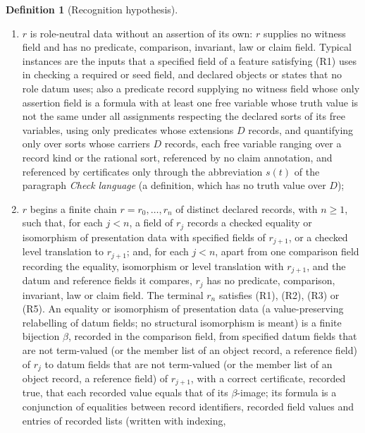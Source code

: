 \documentclass[11pt]{article}
\theoremstyle{definition}
\newtheorem{definition}[theorem]{Definition}
\begin{document}
\begin{definition}[Recognition hypothesis]
\begin{enumerate}[label=(R\arabic*),topsep=2pt,itemsep=1pt]
    formula schema of a witness-schema annotation has field role datum or
    reference; a substantive assertion in a claim statement is represented by
    content records (Definition~\ref{def:annotations}), which are assessed
    under (R1)--(R5);
  \item \(r\) is role-neutral data without an assertion of its own: \(r\)
    supplies no witness field and has no predicate, comparison, invariant,
    law or claim field. Typical instances are the inputs that a specified field
    of a feature satisfying (R1) uses in checking a required or seed field, and
    declared objects or states that no role datum uses; also a predicate record supplying no witness field whose only assertion field is a formula with at least one free variable whose truth value is not the same under all assignments respecting the declared sorts of its free variables, using only predicates whose extensions \(D\) records, and quantifying only over sorts whose carriers \(D\) records, each free variable ranging over a record kind or the rational sort, referenced by no claim annotation, and referenced by certificates only through the abbreviation \(s(t)\) of the paragraph \emph{Check language} (a definition, which has no truth value over \(D\));
  \item \(r\) begins a finite chain \(r=r_0,\ldots,r_n\) of distinct
    declared records, with \(n\geq1\), such that, for each \(j<n\), a field of \(r_j\) records a checked
    equality or isomorphism of presentation data with specified fields of
    \(r_{j+1}\), or a checked level translation to \(r_{j+1}\); and, for each \(j<n\), apart from one comparison field recording the equality, isomorphism or level translation with \(r_{j+1}\), and the datum and reference fields it compares, \(r_j\) has no predicate, comparison, invariant, law or claim field. The terminal \(r_n\) satisfies (R1), (R2), (R3) or
    (R5). An equality or isomorphism of presentation data (a value-preserving
    relabelling of datum fields; no structural isomorphism is meant) is a finite
    bijection \(\beta\), recorded in the comparison field, from specified datum fields that are not term-valued
    (or the member list of an object record, a reference field) of \(r_j\) to datum fields that are not term-valued (or the member list of an object record, a reference field) of \(r_{j+1}\), with a
    correct certificate, recorded true, that each recorded value equals that of its \(\beta\)-image;
    its formula is a conjunction of equalities between record identifiers,
    recorded field values and entries of recorded lists (written with indexing,

\end{enumerate}
\end{definition}
\end{document}
